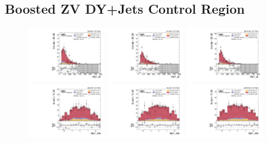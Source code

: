 \clearpage
\subsection{
  Boosted ZV DY+Jets Control Region
}

\begin{figure}[!ht]
  \centering
  \includegraphics[width=0.30\textwidth]{analysis_plots/2016_zv/cr_vjets_e/lep1_pt.pdf}
  \includegraphics[width=0.30\textwidth]{analysis_plots/2017_zv/cr_vjets_e/lep1_pt.pdf}
  \includegraphics[width=0.30\textwidth]{analysis_plots/2018_zv/cr_vjets_e/lep1_pt.pdf} \\
  \includegraphics[width=0.30\textwidth]{analysis_plots/2016_zv/cr_vjets_e/lep1_eta.pdf}
  \includegraphics[width=0.30\textwidth]{analysis_plots/2017_zv/cr_vjets_e/lep1_eta.pdf}
  \includegraphics[width=0.30\textwidth]{analysis_plots/2018_zv/cr_vjets_e/lep1_eta.pdf} \\

\end{figure}

